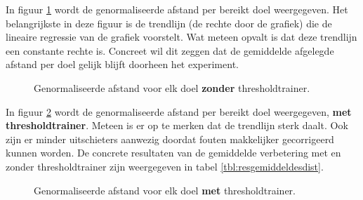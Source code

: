 \documentclass{article}
\newcommand{\figwidth}{0.75\linewidth}
\begin{document}
In figuur \ref{fig:resdistnt} wordt de genormaliseerde afstand per bereikt doel weergegeven. Het belangrijkste in deze figuur is de trendlijn (de rechte door de grafiek) die de lineaire regressie van de grafiek voorstelt. Wat meteen opvalt is dat deze trendlijn een constante rechte is. Concreet wil dit zeggen dat de gemiddelde afgelegde afstand per doel gelijk blijft doorheen het experiment.\\
\begin{figure}[H]
	\centering
	\caption{Genormaliseerde afstand voor elk doel \textbf{zonder} thresholdtrainer.}
	\label{fig:resdistnt}
\end{figure}
In figuur \ref{fig:resdistwt} wordt de genormaliseerde afstand per bereikt doel weergegeven, \textbf{met thresholdtrainer}. Meteen is er op te merken dat de trendlijn sterk daalt. Ook zijn er minder uitschieters aanwezig doordat fouten makkelijker gecorrigeerd kunnen worden. De concrete resultaten van de gemiddelde verbetering met en zonder thresholdtrainer zijn weergegeven in tabel \ref{tbl:resgemiddeldesdist}.
\begin{figure}[H]
	\centering
	\caption{Genormaliseerde afstand voor elk doel \textbf{met} thresholdtrainer.}
	\label{fig:resdistwt}
	
\end{figure}
\end{document}
